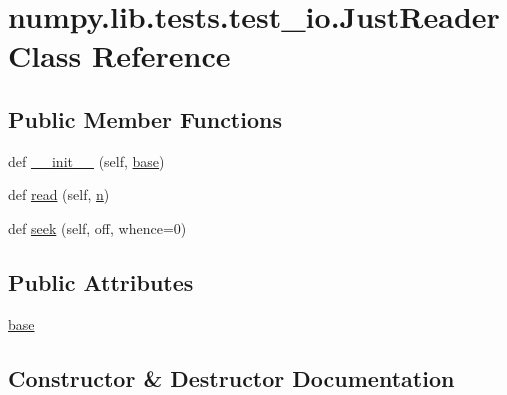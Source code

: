 \hypertarget{classnumpy_1_1lib_1_1tests_1_1test__io_1_1JustReader}{}\section{numpy.\+lib.\+tests.\+test\+\_\+io.\+Just\+Reader Class Reference}
\label{classnumpy_1_1lib_1_1tests_1_1test__io_1_1JustReader}
\subsection*{Public Member Functions}
\begin{DoxyCompactItemize}
\item 
def \hyperlink{classnumpy_1_1lib_1_1tests_1_1test__io_1_1JustReader_a5e04d7c9a448796752f74b0bd762c6ec}{\+\_\+\+\_\+init\+\_\+\+\_\+} (self, \hyperlink{classnumpy_1_1lib_1_1tests_1_1test__io_1_1JustReader_a3d7674c3c55f373d69d2fa0ce729b516}{base})
\item 
def \hyperlink{classnumpy_1_1lib_1_1tests_1_1test__io_1_1JustReader_accbe795aa938076c73b7e0feb4dd69af}{read} (self, \hyperlink{namespacenumpy_a352663c52853d2754274407d5cae2832}{n})
\item 
def \hyperlink{classnumpy_1_1lib_1_1tests_1_1test__io_1_1JustReader_a0fd339cf94a2dd10bc84c7de5a7278c8}{seek} (self, off, whence=0)
\end{DoxyCompactItemize}
\subsection*{Public Attributes}
\begin{DoxyCompactItemize}
\item 
\hyperlink{classnumpy_1_1lib_1_1tests_1_1test__io_1_1JustReader_a3d7674c3c55f373d69d2fa0ce729b516}{base}
\end{DoxyCompactItemize}


\subsection{Constructor \& Destructor Documentation}
\mbox{\label{classnumpy_1_1lib_1_1tests_1_1test__io_1_1JustReader_a5e04d7c9a448796752f74b0bd762c6ec}} 
